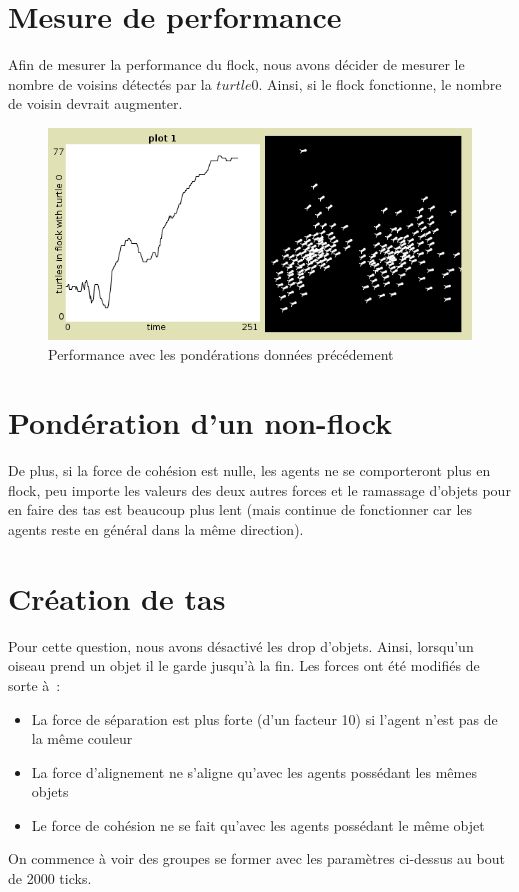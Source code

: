 \documentclass{article}
\begin{document}
\section{Mesure de performance}

Afin de mesurer la performance du flock, nous avons décider de mesurer le nombre de voisins détectés par la $turtle 0$. Ainsi, si le flock fonctionne, le nombre de voisin devrait augmenter.

\begin{figure}[h]
	\begin{center}
		\includegraphics[scale=0.5]{img/performance}
		\caption{Performance avec les pondérations données précédement}
		\label{fig:performance}
	\end{center}
\end{figure}

\section{Pondération d'un non-flock}
De plus, si la force de cohésion est nulle, les agents ne se comporteront plus en flock, peu importe les valeurs des deux autres forces et le ramassage d'objets pour en faire des tas est beaucoup plus lent (mais continue de fonctionner car les agents reste en général dans la même direction).

\section{Création de tas}

Pour cette question, nous avons désactivé les drop d'objets. Ainsi, lorsqu'un oiseau prend un objet il le garde jusqu'à la fin.
Les forces ont été modifiés de sorte à~:
\begin{itemize}
  \item La force de séparation est plus forte (d'un facteur 10) si l'agent n'est pas de la même couleur
  \item La force d'alignement ne s'aligne qu'avec les agents possédant les mêmes objets
  \item Le force de cohésion ne se fait qu'avec les agents possédant le même objet
\end{itemize}
On commence à voir des groupes se former avec les paramètres ci-dessus au bout de 2000 ticks.
\end{document}
